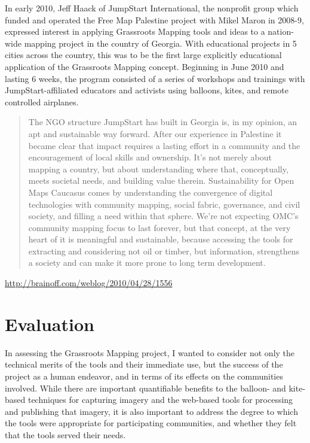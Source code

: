 \documentclass[11pt]{report}
\begin{document}
In early 2010, Jeff Haack of JumpStart International, the nonprofit group which funded and operated the Free Map Palestine project with Mikel Maron in 2008-9, expressed interest in applying Grassroots Mapping tools and ideas to a nation-wide mapping project in the country of Georgia. With educational projects in 5 cities across the country, this was to be the first large explicitly educational application of the Grassroots Mapping concept. Beginning in June 2010 and lasting 6 weeks, the program consisted of a series of workshops and trainings with JumpStart-affiliated educators and activists using balloons, kites, and remote controlled airplanes.

\begin{quote}The NGO structure JumpStart has built in Georgia is, in my opinion, an apt and sustainable way forward. After our experience in Palestine it became clear that impact requires a lasting effort in a community and the encouragement of local skills and ownership. It’s not merely about mapping a country, but about understanding where that, conceptually, meets societal needs, and building value therein. Sustainability for Open Maps Caucasus comes by understanding the convergence of digital technologies with community mapping, social fabric, governance, and civil society, and filling a need within that sphere. We’re not expecting OMC’s community mapping focus to last forever, but that concept, at the very heart of it is meaningful and sustainable, because accessing the tools for extracting and considering not oil or timber, but information, strengthens a society and can make it more prone to long term development.\end{quote} \url{http://brainoff.com/weblog/2010/04/28/1556}

\chapter{Evaluation}

In assessing the Grassroots Mapping project, I wanted to consider not only the technical merits of the tools and their immediate use, but the success of the project as a human endeavor, and in terms of its effects on the communities involved. While there are important quantifiable benefits to the balloon- and kite-based techniques for capturing imagery and the web-based tools for processing and publishing that imagery, it is also important to address the degree to which the tools were appropriate for participating communities, and whether they felt that the tools served their needs. 
\end{document}
